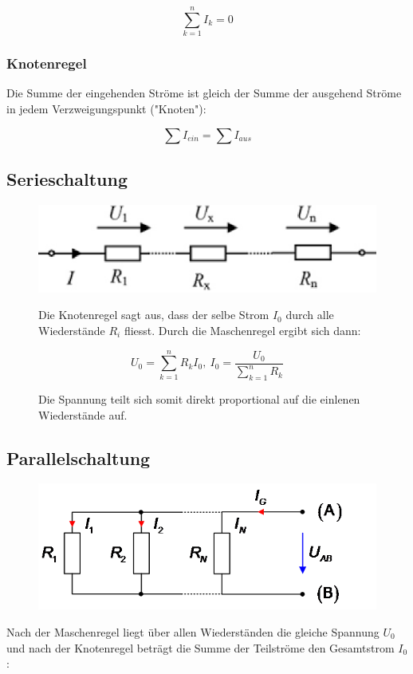 \documentclass[a4paper,12pt]{article}
\begin{document}
\[\sum_{k = 1}^{n} I_k = 0 \]


\subsubsection{Knotenregel}

Die Summe der eingehenden Ströme ist gleich der Summe der ausgehend Ströme in jedem 
Verzweigungspunkt ("Knoten"):

\[\sum I_{ein} = \sum I_{aus}\]


\subsection{Serieschaltung}

\begin{figure}[H]

\includegraphics[width=.4\textwidth]{media/SerieschaltFert.png}

Die Knotenregel sagt aus, dass der selbe Strom $I_0$ durch alle Wiederstände $R_i$ fliesst. Durch
die Maschenregel ergibt sich dann:

\[U_0 = \sum_{k=1}^{n} R_k I_0 ,\ I_0 = \frac{U_0}{\sum_{k=1}^{n} R_k }\] 

Die Spannung teilt sich somit direkt proportional auf die einlenen Wiederstände auf.

\end{figure}

\newpage

\subsection{Parallelschaltung}

\begin{figure}[H]

\includegraphics[width=.4\textwidth]{media/ParallelschaltungFert.png}

\end{figure}

Nach der Maschenregel liegt über allen Wiederständen die gleiche Spannung $U_0$ und nach der 
Knotenregel beträgt die Summe der Teilströme den Gesamtstrom $I_0$:
\end{document}
